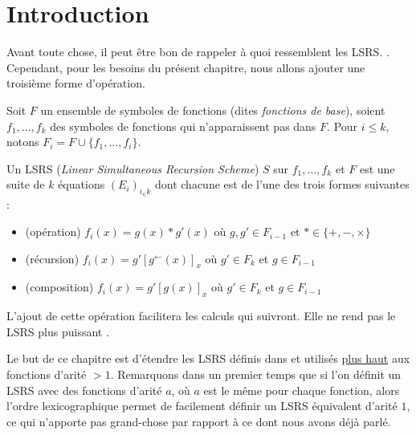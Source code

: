 \documentclass{report}
\newcommand{\eqpred}[3]{#1\left[ #2^{\leftarrow}(#3) \right]_{#3}}
\begin{document}
	\section{Introduction}
	\label{sec:rintroduction}
	
	Avant toute chose, il peut être bon de rappeler à quoi ressemblent les LSRS. \cite{Schwentick1997} \cite{GrandjeanSchwentick2002}. Cependant, pour les besoins du présent chapitre, nous allons ajouter une troisième forme d'opération.
	
	
	\begin{definition}[LSRS]
		\label{def:LSRS_2}
		Soit $F$ un ensemble de symboles de fonctions (dites \emph{fonctions de base}), soient $f_1, \dots, f_k$ des symboles de fonctions qui n'apparaissent pas dans $F$. Pour $i\leqslant k$, notons $F_i = F\cup \{f_1, \dots, f_i\}$. 
	
		Un LSRS (\emph{Linear Simultaneous Recursion Scheme}) $S$ sur $f_1, \dots, f_k$ et $F$ est une suite de $k$ équations $\left(E_i\right)_{i_\in k}$ dont chacune est de l'une des trois formes suivantes :
		
		\begin{itemize}[itemsep=-1mm]
			\item 	(opération) 		$f_i(x) = g(x) * g'(x)$ où $g,g' \in F_{i-1}$ et $* \in \{+, -, \times \}$\footnotemark
			
			
			\item 	(récursion)			$f_i(x) = \eqpred{g'}{g}{x}$ où $g' \in F_k$ et $g \in F_{i-1}$			
			
			\item 	(composition)			$f_i(x) = g'\left[g(x)\right]_x$ où $g' \in F_k$ et $g \in F_{i-1}$
		\end{itemize}
	\end{definition}
	
	\begin{remark}
		L'ajout de cette opération facilitera les calculs qui suivront. Elle ne rend pas le LSRS plus puissant \cite{GrandjeanSchwentick2002}.
	\end{remark}
	
	Le but de ce chapitre est d'étendre les LSRS définis dans \cite{GrandjeanSchwentick2002} et utilisés \hyperref[def:LSRS]{plus haut} aux fonctions d'arité $>1$. Remarquons dans un premier temps que si l'on définit un LSRS avec des fonctions d'arité $a$, où $a$ est le même pour chaque fonction, alors l'ordre lexicographique permet de facilement définir un LSRS équivalent d'arité $1$, ce qui n'apporte pas grand-chose par rapport à ce dont nous avons déjà parlé.
	
\end{document}
